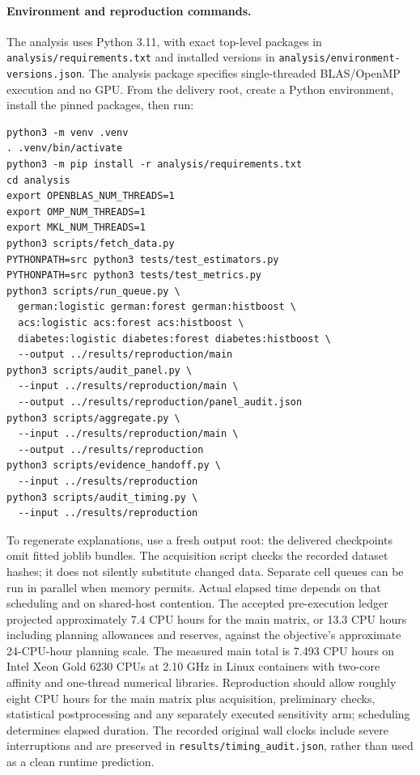 \paragraph{Environment and reproduction commands.}
The analysis uses Python 3.11, with exact top-level packages in \texttt{analysis/requirements.txt} and installed versions in \texttt{analysis/environment-versions.json}. The analysis package specifies single-threaded BLAS/OpenMP execution and no GPU. From the delivery root, create a Python environment, install the pinned packages, then run:
\begin{verbatim}
python3 -m venv .venv
. .venv/bin/activate
python3 -m pip install -r analysis/requirements.txt
cd analysis
export OPENBLAS_NUM_THREADS=1
export OMP_NUM_THREADS=1
export MKL_NUM_THREADS=1
python3 scripts/fetch_data.py
PYTHONPATH=src python3 tests/test_estimators.py
PYTHONPATH=src python3 tests/test_metrics.py
python3 scripts/run_queue.py \
  german:logistic german:forest german:histboost \
  acs:logistic acs:forest acs:histboost \
  diabetes:logistic diabetes:forest diabetes:histboost \
  --output ../results/reproduction/main
python3 scripts/audit_panel.py \
  --input ../results/reproduction/main \
  --output ../results/reproduction/panel_audit.json
python3 scripts/aggregate.py \
  --input ../results/reproduction/main \
  --output ../results/reproduction
python3 scripts/evidence_handoff.py \
  --input ../results/reproduction
python3 scripts/audit_timing.py \
  --input ../results/reproduction
\end{verbatim}
To regenerate explanations, use a fresh output root: the delivered checkpoints omit fitted joblib bundles. The acquisition script checks the recorded dataset hashes; it does not silently substitute changed data. Separate cell queues can be run in parallel when memory permits. Actual elapsed time depends on that scheduling and on shared-host contention. The accepted pre-execution ledger projected approximately 7.4 CPU hours for the main matrix, or 13.3 CPU hours including planning allowances and reserves, against the objective's approximate 24-CPU-hour planning scale. The measured main total is 7.493 CPU hours on Intel Xeon Gold 6230 CPUs at 2.10 GHz in Linux containers with two-core affinity and one-thread numerical libraries. Reproduction should allow roughly eight CPU hours for the main matrix plus acquisition, preliminary checks, statistical postprocessing and any separately executed sensitivity arm; scheduling determines elapsed duration. The recorded original wall clocks include severe interruptions and are preserved in \texttt{results/timing\_audit.json}, rather than used as a clean runtime prediction.

